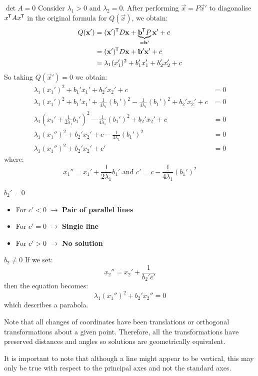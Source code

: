 \documentclass[../main.tex]{subfiles}
\begin{document}
\begin{proofcases}
\begin{case}{$\det A = 0$}
    Consider $\lambda_1 > 0$ and $\lambda_2 = 0$.
    After performing $\vec{x} = P\vec{x}'$ to diagonalise $x^{{\mkern-1.5mu\mathsf{T}}} A x^{{\mkern-1.5mu\mathsf{T}}}$ in the original formula for $Q(\vec{x})$, we obtain:
    \begin{align*}
      Q(\mathbf{\bm{x}}') &= (\mathbf{\bm{x}}')^{{\mkern-1.5mu\mathsf{T}}} D \mathbf{\bm{x}} + \underbrace{\mathbf{\bm{b}}^{{\mkern-1.5mu\mathsf{T}}} P}_{= \mathbf{\bm{b}}'} \mathbf{\bm{x}}' + c \\
                  &= (\mathbf{\bm{x}}')^{{\mkern-1.5mu\mathsf{T}}} D \mathbf{\bm{x}} + \mathbf{\bm{b}}'\mathbf{\bm{x}}' + c \\
                  &= \lambda_1 (x_1')^2 + b_1' x_1' + b_2' x_2' + c
    \end{align*}
    So taking $Q(\vec{x}') = 0$ we obtain:
    \begin{align*}
      \lambda_1(x_1')^2 + b_1'x_1' + b_2'x_2' + c &= 0 \\
      \lambda_1(x_1')^2 + b_1'x_1' + \frac{1}{4\lambda_1}(b_1')^2 - \frac{1}{4\lambda_1}(b_1')^2 + b_2'x_2' + c &= 0 \\
      \lambda_1\left(x_1' + \frac{1}{2\lambda_1}b_1'\right)^2 - \frac{1}{4\lambda_1}(b_1')^2 + b_2'x_2' + c &= 0 \\
      \lambda_1(x_1'')^2 + b_2'x_2' + c - \frac{1}{4 \lambda_{1}}(b_1')^2 &= 0 \\
      \lambda_1(x_1'')^2 + b_2'x_2' + c' &= 0
    \end{align*}
    where:
    \[
      x_1'' = x_1' + \frac{1}{2\lambda_1}b_1' \text{ and } c'=c-\frac{1}{4\lambda_1}(b_1')^2
    \]
    \begin{proofcases}
      \begin{case}{$b_2' = 0$}
        \begin{itemize}
          \item For $c' < 0$ $\to$ \textbf{Pair of parallel lines}
          \item For $c' = 0$ $\to$ \textbf{Single line}
          \item For $c' > 0$ $\to$ \textbf{No solution}
        \end{itemize}
      \end{case}
      \begin{case}{$b_2 \neq 0$}
        If we set:
        \[
          x_2'' = x_2' + \frac{1}{b_2' c'}
        \]
        then the equation becomes:
        \[
          \lambda_1(x_1'')^2 + b_2'x_2'' = 0
        \]
        which describes a parabola.
      \end{case}
    \end{proofcases}
  \end{case}
  Note that all changes of coordinates have been translations or orthogonal transformations about a given point.
  Therefore, all the transformations have preserved distances and angles so solutions are geometrically equivalent.

  It is important to note that although a line might appear to be vertical, this may only be true with respect to the principal axes and not the standard axes.
\end{proofcases}
\end{document}
